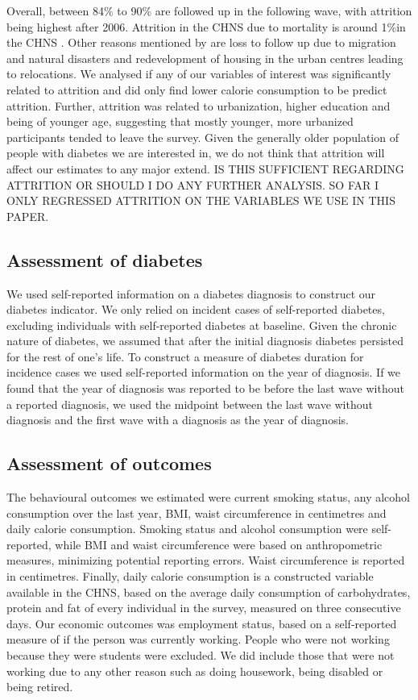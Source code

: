 Overall, between 84\% to 90\% are followed up in the following wave, with attrition being highest after 2006. Attrition in the \ac{CHNS} due to mortality is around 1\%in the \ac{CHNS} \parencite{Popkin2010}. Other reasons mentioned by \textcite{Popkin2010} are loss to follow up due to migration and natural disasters and redevelopment of housing in the urban centres leading to relocations. We analysed if any of our variables of interest was significantly related to attrition and did only find lower calorie consumption to be predict attrition. Further, attrition was related to urbanization, higher education and being of younger age, suggesting that mostly younger, more urbanized participants tended to leave the survey. Given the generally older population of people with diabetes we are interested in, we do not think that attrition will affect our estimates to any major extend. IS THIS SUFFICIENT REGARDING ATTRITION OR SHOULD I DO ANY FURTHER ANALYSIS. SO FAR I ONLY REGRESSED ATTRITION ON THE VARIABLES WE USE IN THIS PAPER.


\subsection*{Assessment of diabetes}

We used self-reported information on a diabetes diagnosis to construct our diabetes indicator. We only relied on incident cases of self-reported diabetes, excluding individuals with self-reported diabetes at baseline. Given the chronic nature of diabetes, we assumed that after the initial diagnosis diabetes persisted for the rest of one's life. To construct a measure of diabetes duration for incidence cases we used self-reported information on the year of diagnosis. If we found that the year of diagnosis was reported to be before the last wave without a reported diagnosis, we used the midpoint between the last wave without diagnosis and the first wave with a diagnosis as the year of diagnosis. 

\subsection*{Assessment of outcomes}

The behavioural outcomes we estimated were current smoking status, any alcohol consumption over the last year, \ac{BMI}, waist circumference in centimetres and daily calorie consumption. Smoking status and alcohol consumption were self-reported, while \ac{BMI} and waist circumference were based on anthropometric measures, minimizing potential reporting errors. Waist circumference is reported in centimetres. Finally, daily calorie consumption is a constructed variable available in the \ac{CHNS}, based on the average daily consumption of carbohydrates, protein and fat of every individual in the survey, measured on three consecutive days. Our economic outcomes was employment status, based on a self-reported measure of if the person was currently working. People who were not working because they were students were excluded. We did include those that were not working due to any other reason such as doing housework, being disabled or being retired.


